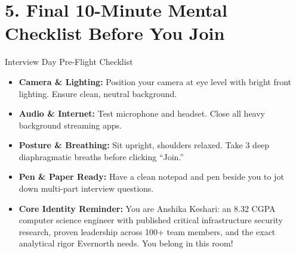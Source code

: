 \documentclass[10pt,a4paper]{article}
\begin{document}
\section{5. Final 10-Minute Mental Checklist Before You Join}

\begin{calloutbox}{Interview Day Pre-Flight Checklist}
\begin{itemize}[noitemsep]
    \item[$\square$] \textbf{Camera \& Lighting:} Position your camera at eye level with bright front lighting. Ensure clean, neutral background.
    \item[$\square$] \textbf{Audio \& Internet:} Test microphone and headset. Close all heavy background streaming apps.
    \item[$\square$] \textbf{Posture \& Breathing:} Sit upright, shoulders relaxed. Take 3 deep diaphragmatic breaths before clicking ``Join.''
    \item[$\square$] \textbf{Pen \& Paper Ready:} Have a clean notepad and pen beside you to jot down multi-part interview questions.
    \item[$\square$] \textbf{Core Identity Reminder:} You are Anshika Keshari: an 8.32 CGPA computer science engineer with published critical infrastructure security research, proven leadership across 100+ team members, and the exact analytical rigor Evernorth needs. You belong in this room!
\end{itemize}
\end{calloutbox}
\end{document}
